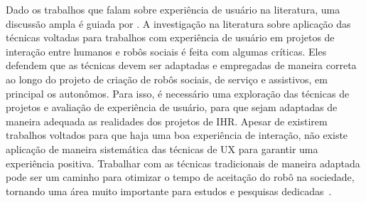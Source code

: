 Dado os trabalhos que falam sobre experiência de usuário na literatura, uma discussão ampla é guiada por \textcite{alenljung:2017}. A investigação na literatura sobre aplicação das técnicas voltadas para trabalhos com experiência de usuário em projetos de interação entre humanos e robôs sociais é feita com algumas críticas. Eles defendem que as técnicas devem ser adaptadas e empregadas de maneira correta ao longo do projeto de criação de robôs sociais, de serviço e assistivos, em principal os autonômos. Para isso, é necessário uma exploração das técnicas de projetos e avaliação de experiência de usuário, para que sejam adaptadas de maneira adequada as realidades dos projetos de IHR. Apesar de existirem trabalhos voltados para que haja uma boa experiência de interação, não existe aplicação de maneira sistemática das técnicas de UX para garantir uma experiência positiva. Trabalhar com as técnicas tradicionais de maneira adaptada pode ser um caminho para otimizar o tempo de aceitação do robô na sociedade, tornando uma área muito importante para estudos e pesquisas dedicadas~\cite{alenljung:2017}.
